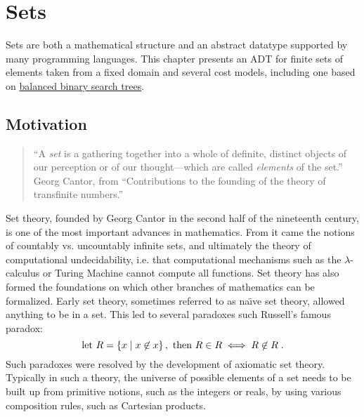 \chapter{Sets}
\label{XXch:sets}

\begin{preamble}
  Sets  are both a mathematical structure and an abstract datatype
  supported by many programming languages.  This chapter presents an ADT for
  finite sets of elements taken from a fixed domain and several cost models, including one based on \href{ch:bst::adt}{balanced binary search trees}.

\end{preamble}

\begin{code}[10]


\end{code}

\section{Motivation}
\label{XXsec:sets::math}


\begin{gram}
\begin{quote}

``A \emph{set} is a gathering together into a whole of definite, distinct
objects of our perception or of our thought---which are called \emph{elements}
of the set.''\\[.1in] Georg Cantor, from ``Contributions to the founding of the theory of transfinite numbers.''
\end{quote}

Set theory, founded by Georg Cantor in the second half of the
nineteenth century, is one of the most important advances in
mathematics.  From it came the notions of countably vs. uncountably
infinite sets, and ultimately the theory of computational
undecidability, i.e. that computational mechanisms such as the
$\lambda$-calculus or Turing Machine cannot compute all functions.
Set theory has also formed the foundations on which other branches of
mathematics can be formalized.  Early set theory, sometimes referred
to as na\"{\i}ve set theory, allowed anything to be in a set.  This
led to several paradoxes such Russell's famous paradox:
  \[\mbox{let } R = \left\{ x \;|\; x \not\in x \right\}, \mbox{ then } R \in R \iff R \not\in R
\;.\] Such paradoxes were resolved by the development of axiomatic set
theory.  Typically in such a theory, the universe of possible elements
of a set needs to be built up from primitive notions, such as the
integers or reals, by using various composition rules, such as
Cartesian products.
\end{gram}

